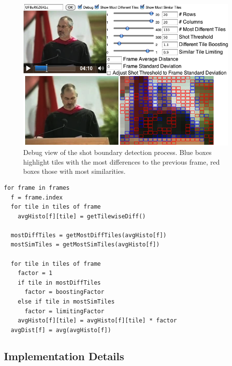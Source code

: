 \begin{figure}
  \begin{center}
    \includegraphics[width=1.0\linewidth]{./algorithm.png}
  \end{center}
  \caption[Debug view of the shot boundary detection process]
    {Debug view of the shot boundary detection process.
    Blue boxes highlight tiles with the most differences
    to the previous frame, red boxes those with most similarities.}
  \label{fig:algorithm}
\end{figure}

\begin{lstlisting}[caption=Pseudocode of shot boundary detection
  algorithm.,
  label=code:algorithm, float]
for frame in frames
  f = frame.index  
  for tile in tiles of frame      
    avgHisto[f][tile] = getTilewiseDiff()
 
  mostDiffTiles = getMostDiffTiles(avgHisto[f])
  mostSimTiles = getMostSimTiles(avgHisto[f])
 
  for tile in tiles of frame    
    factor = 1  
    if tile in mostDiffTiles
      factor = boostingFactor
    else if tile in mostSimTiles
      factor = limitingFactor
    avgHisto[f][tile] = avgHisto[f][tile] * factor
  avgDist[f] = avg(avgHisto[f])
\end{lstlisting}

\subsection{Implementation Details}
\label{sec:implementation}

